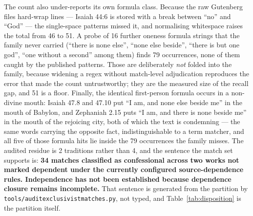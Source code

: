 \documentclass[11pt]{article}
\DeclareRobustCommand{\_}{\textunderscore\allowbreak}
\begin{document}
The count also under-reports its own formula class. Because the raw Gutenberg
files hard-wrap lines --- Isaiah 44:6 is stored with a break between ``no'' and
``God'' --- the single-space patterns missed it, and normalising whitespace raises
the total from 46 to 51. A probe of 16 further oneness formula strings that the
family never carried (``there is none else'', ``none else beside'', ``there is but
one god'', ``one without a second'' among them) finds 79 occurrences, none of them
caught by the published patterns. Those are deliberately \emph{not} folded into
the family, because widening a regex without match-level adjudication reproduces
the error that made the count untrustworthy; they are the measured size of the
recall gap, and 51 is a floor. Finally, the identical first-person formula occurs
in a non-divine mouth: Isaiah 47.8 and 47.10 put ``I am, and none else beside
me'' in the mouth of Babylon, and Zephaniah 2.15 puts ``I am, and there is none
beside me'' in the mouth of the rejoicing city, both of which the text is
condemning --- the same words carrying the opposite fact, indistinguishable to a
term matcher, and all five of those formula hits lie inside the 79 occurrences the
family misses. The audited residue is 2 traditions rather than 4, and the sentence
the match set supports is: \textbf{34 matches classified as confessional across two
works not marked dependent under the currently configured source-dependence rules.
Independence has not been established because dependence closure remains
incomplete.} That sentence is generated from the partition by
\texttt{tools/audit\_exclusivist\_matches.py}, not typed, and Table~\ref{tab:disposition}
is the partition itself.
\end{document}
